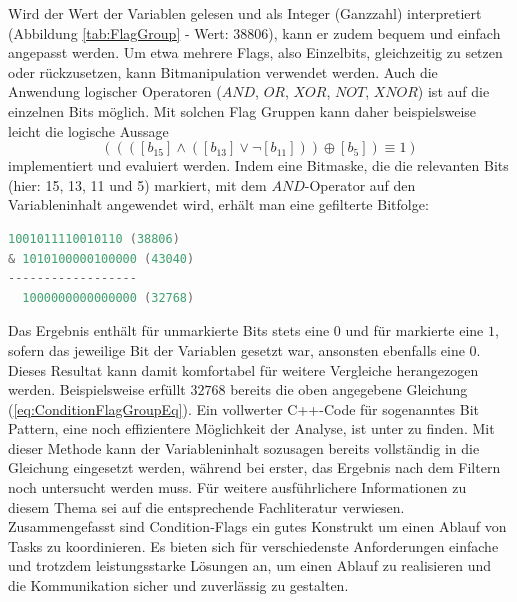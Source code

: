 \documentclass{llncs}
\begin{document}
Wird der Wert der Variablen gelesen und als Integer (Ganzzahl) interpretiert (Abbildung \ref{tab:FlagGroup} - Wert: $38806$), kann er zudem bequem und einfach angepasst werden. Um etwa mehrere Flags, also Einzelbits, gleichzeitig zu setzen oder rückzusetzen, kann Bitmanipulation verwendet werden. Auch die Anwendung logischer Operatoren ($AND$, $OR$, $XOR$, $NOT$, $XNOR$) ist auf die einzelnen Bits möglich. Mit solchen Flag Gruppen kann daher beispielsweise leicht die logische Aussage
\begin{equation}
((([b_{15}] \wedge ([b_{13}] \vee \neg[b_{11}]))\oplus [b_{5}])\equiv 1)
\label{eq:ConditionFlagGroupEq}
\end{equation}
implementiert und evaluiert werden. Indem eine Bitmaske, die die relevanten Bits (hier: 15, 13, 11 und 5) markiert, mit dem $AND$-Operator auf den Variableninhalt angewendet wird, erhält man eine gefilterte Bitfolge:
{
\lstset{basicstyle=\footnotesize, frame=tb, xleftmargin=.36\textwidth, xrightmargin=.3\textwidth}
\begin{lstlisting}[language=C]
  1001011110010110 (38806)
& 1010100000100000 (43040)
------------------
  1000000000000000 (32768)
\end{lstlisting}
}
Das Ergebnis enthält für unmarkierte Bits stets eine $0$ und für markierte eine $1$, sofern das jeweilige Bit der Variablen gesetzt war, ansonsten ebenfalls eine $0$. Dieses Resultat kann damit komfortabel für weitere Vergleiche herangezogen werden. Beispielsweise erfüllt $32768$ bereits die oben angegebene Gleichung (\ref{eq:ConditionFlagGroupEq}). Ein vollwerter C++-Code für sogenanntes Bit Pattern, eine noch effizientere Möglichkeit der Analyse, ist unter \autocite{Turner2020} zu finden. Mit dieser Methode kann der Variableninhalt sozusagen bereits vollständig in die Gleichung eingesetzt werden, während bei erster, das Ergebnis nach dem Filtern noch untersucht werden muss. Für weitere ausführlichere Informationen zu diesem Thema sei auf die entsprechende Fachliteratur verwiesen.\\

Zusammengefasst sind Condition-Flags ein gutes Konstrukt um einen Ablauf von Tasks zu koordinieren. Es bieten sich für verschiedenste Anforderungen einfache und trotzdem leistungsstarke Lösungen an, um einen Ablauf zu realisieren und die Kommunikation sicher und zuverlässig zu gestalten.
\end{document}
